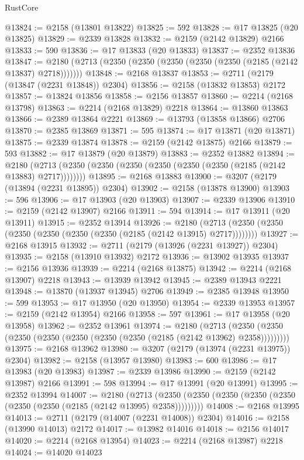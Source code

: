 \begin{lexlean}{RustCore}
\begin{coremodule}
@13824 := @2158 (@13801 @13822)
@13825 := 592
@13828 := @17 @13825 (@20 @13825)
@13829 := @2339 @13828
@13832 := @2159 (@2142 @13829) @2166
@13833 := 590
@13836 := @17 @13833 (@20 @13833)
@13837 := @2352 @13836
@13847 := @2180 (@2713 (@2350 (@2350 (@2350 (@2350 (@2350 (@2185 (@2142 @13837) @2718)))))))
@13848 := @2168 @13837
@13853 := @2711 (@2179 (@13847 (@2231 @13848)) @2304)
@13856 := @2158 (@13832 @13853) @2172
@13857 := @13824 @13856
@13858 := @2156 @13857
@13860 := @2214 (@2168 @13798)
@13863 := @2214 (@2168 @13829) @2218
@13864 := @13860 @13863
@13866 := @2389 @13864 @2221
@13869 := @13793 (@13858 @13866) @2706
@13870 := @2385 @13869
@13871 := 595
@13874 := @17 @13871 (@20 @13871)
@13875 := @2339 @13874
@13878 := @2159 (@2142 @13875) @2166
@13879 := 593
@13882 := @17 @13879 (@20 @13879)
@13883 := @2352 @13882
@13894 := @2180 (@2713 (@2350 (@2350 (@2350 (@2350 (@2350 (@2350 (@2185 (@2142 @13883) @2717))))))))
@13895 := @2168 @13883
@13900 := @3207 (@2179 (@13894 (@2231 @13895)) @2304)
@13902 := @2158 (@13878 @13900)
@13903 := 596
@13906 := @17 @13903 (@20 @13903)
@13907 := @2339 @13906
@13910 := @2159 (@2142 @13907) @2166
@13911 := 594
@13914 := @17 @13911 (@20 @13911)
@13915 := @2352 @13914
@13926 := @2180 (@2713 (@2350 (@2350 (@2350 (@2350 (@2350 (@2350 (@2185 (@2142 @13915) @2717))))))))
@13927 := @2168 @13915
@13932 := @2711 (@2179 (@13926 (@2231 @13927)) @2304)
@13935 := @2158 (@13910 @13932) @2172
@13936 := @13902 @13935
@13937 := @2156 @13936
@13939 := @2214 (@2168 @13875)
@13942 := @2214 (@2168 @13907) @2218
@13943 := @13939 @13942
@13945 := @2389 @13943 @2221
@13948 := @13870 (@13937 @13945) @2706
@13949 := @2385 @13948
@13950 := 599
@13953 := @17 @13950 (@20 @13950)
@13954 := @2339 @13953
@13957 := @2159 (@2142 @13954) @2166
@13958 := 597
@13961 := @17 @13958 (@20 @13958)
@13962 := @2352 @13961
@13974 := @2180
    (@2713 (@2350 (@2350 (@2350 (@2350 (@2350 (@2350 (@2350 (@2185 (@2142 @13962) @2358)))))))))
@13975 := @2168 @13962
@13980 := @3207 (@2179 (@13974 (@2231 @13975)) @2304)
@13982 := @2158 (@13957 @13980)
@13983 := 600
@13986 := @17 @13983 (@20 @13983)
@13987 := @2339 @13986
@13990 := @2159 (@2142 @13987) @2166
@13991 := 598
@13994 := @17 @13991 (@20 @13991)
@13995 := @2352 @13994
@14007 := @2180
    (@2713 (@2350 (@2350 (@2350 (@2350 (@2350 (@2350 (@2350 (@2185 (@2142 @13995) @2358)))))))))
@14008 := @2168 @13995
@14013 := @2711 (@2179 (@14007 (@2231 @14008)) @2304)
@14016 := @2158 (@13990 @14013) @2172
@14017 := @13982 @14016
@14018 := @2156 @14017
@14020 := @2214 (@2168 @13954)
@14023 := @2214 (@2168 @13987) @2218
@14024 := @14020 @14023

\end{coremodule}
\end{lexlean}
